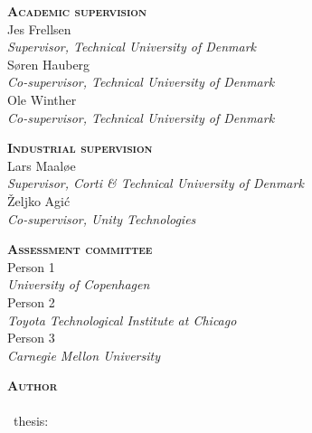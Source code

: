 
\thispagestyle{empty} %

\hfill\vfill

\noindent
\small%
\textsc{\textbf{Academic supervision}}
\medskip
\\Jes Frellsen\\
\textit{Supervisor, Technical University of Denmark}
\medskip
\\Søren Hauberg\\
\textit{Co-supervisor, Technical University of Denmark}
\medskip
\\Ole Winther\\
\textit{Co-supervisor, Technical University of Denmark}
\medskip

\bigskip
\noindent
\textsc{\textbf{Industrial supervision}}
\medskip
\\Lars Maaløe\\
\textit{Supervisor, Corti \& Technical University of Denmark}
\medskip
\\Željko Agi\'c\\
\textit{Co-supervisor, Unity Technologies}
\medskip

\bigskip
\noindent
\textsc{\textbf{Assessment committee}}
\medskip
\\Person 1\\
\textit{University of Copenhagen}
\medskip
\\Person 2\\
\textit{Toyota Technological Institute at Chicago}
\medskip
\\Person 3\\
\textit{Carnegie Mellon University}
\medskip

\bigskip
\noindent
\textsc{\textbf{Author}}
\medskip
\\\thesisauthor\\
\thesistypeabbr\ thesis:\\
\textit{\thesistitle}\\
\textcopyright\ \thesismonth\ \thesisyear

\normalsize
\normalfont

